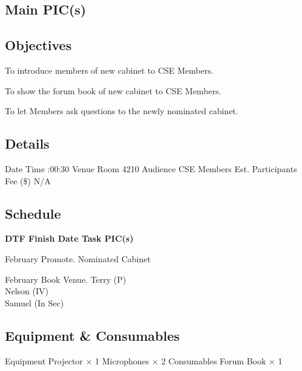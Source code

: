 \startsection[title={CSESS Forum}][
date={\date[d=14, m=2, y=2024][event]},
pic={Terry (P), Nelson (IV), Sam (EV)}]

\subsection{Main PIC(s)}

\subsection{Objectives}
\startitemize
\item To introduce members of new cabinet to CSE Members.
\item To show the forum book of new cabinet to CSE Members.
\item To let Members ask questions to the newly nominated cabinet.
\stopitemize

\subsection{Details}
\starttabulate[|rB|l|]
\NC Date
\NC {} \NR
\NC Time
:00:30 \NR
\NC Venue
\NC Room 4210 \NR
\NC Audience
\NC CSE Members \NR
\NC Est. Participants
 \NR
\NC Fee (\$)
\NC N/A \NR
\stoptabulate

\subsection{Schedule}

\setupTABLE[c][1][width=0.75in]
\setupTABLE[c][2][width=1in]
\setupTABLE[c][3][width=3in]
\setupTABLE[c][4][width=1.25in]
\bTABLE
\bTABLEhead

\bTR\bTH    \bf{DTF}
\eTH\bTH    \bf{Finish Date}
\eTH\bTH    \bf{Task}
\eTH\bTH    \bf{PIC(s)}
\eTH\eTR

\eTABLEhead
\bTABLEbody

\bTR{}
\eTD{} February
\eTD\bTD Promote.
\eTD\bTD Nominated Cabinet
\eTD\eTR

\bTR{}
\eTD{} February
\eTD\bTD Book Venue.
\eTD\bTD Terry (P) \\ Nelson (IV) \\ Samuel (In Sec)
\eTD\eTR

\eTABLEbody
\eTABLE

\subsection{Equipment \& Consumables}
\starttabulate[|l|l|]
\NC{}Equipment\NC\NR
\HL
\NC Projector \NC $\times$ 1 \NR
\NC Microphones \NC $\times$ 2 \NR
\HL
\NR
\NC{}Consumables\NC\NR
\HL
\NC Forum Book \NC $\times$ 1 \NR
\HL
\stoptabulate

